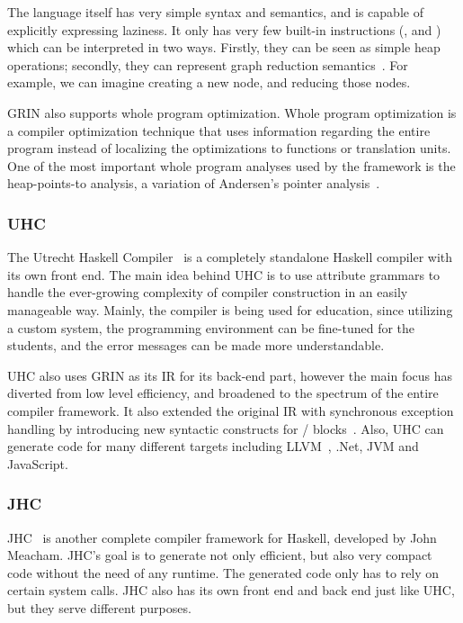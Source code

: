 \documentclass[main.tex]{subfiles}
\begin{document}
	The language itself has very simple syntax and semantics, and is capable of explicitly expressing laziness. It only has very few built-in instructions (,  and ) which can be interpreted in two ways. Firstly, they can be seen as simple heap operations; secondly, they can represent graph reduction semantics~\cite{impl-fun-lang}. For example, we can imagine  creating a new node, and  reducing those nodes.
	
	GRIN also supports whole program optimization. Whole program optimization is a compiler optimization technique that uses information regarding the entire program instead of localizing the optimizations to functions or translation units. One of the most important whole program analyses used by the framework is the heap-points-to analysis, a variation of Andersen's pointer analysis~\cite{andersen-ptr}.
	
	\subsubsection{UHC}
	
	The Utrecht Haskell Compiler~\cite{uhc} is a completely standalone Haskell compiler with its own front end. The main idea behind UHC is to use attribute grammars to handle the ever-growing complexity of compiler construction in an easily manageable way. Mainly, the compiler is being used for education, since utilizing a custom system, the programming environment can be fine-tuned for the students, and the error messages can be made more understandable.
	
	UHC also uses GRIN as its IR for its back-end part, however the main focus has diverted from low level efficiency, and broadened to the spectrum of the entire compiler framework. It also extended the original IR with synchronous exception handling by introducing new syntactic constructs for / blocks~\cite{uhc-exceptional-grin}. Also, UHC can generate code for many different targets including LLVM~\cite{llvm-2004}, .Net, JVM and JavaScript.

	\subsubsection{JHC}
	
	JHC~\cite{jhc} is another complete compiler framework for Haskell, developed by John Meacham. JHC's goal is to generate not only efficient, but also very compact code without the need of any runtime. The generated code only has to rely on certain system calls. JHC also has its own front end and back end just like UHC, but they serve different purposes.
	
\end{document}
